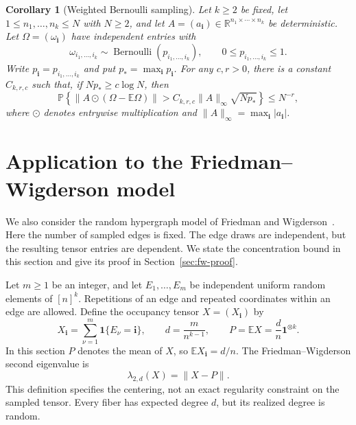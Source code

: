 \documentclass[11pt,reqno]{amsart}
\numberwithin{equation}{section}
\newtheorem{corollary}[theorem]{Corollary}
\theoremstyle{definition}
\theoremstyle{remark}
\newcommand{\E}{\mathbb E}
\newcommand{\Pp}{\mathbb P}
\newcommand{\R}{\mathbb R}
\newcommand{\one}{\mathbf 1}
\begin{document}
\begin{corollary}[Weighted Bernoulli sampling]\label{cor:weighted}
Let $k\ge2$ be fixed, let $1\le n_1,\ldots,n_k\le N$ with $N\ge2$,
and let $A=(a_{\mathbf i})\in\R^{n_1\times\cdots\times n_k}$ be
deterministic. Let $\Omega=(\omega_{\mathbf i})$ have independent
entries with
\[
 \omega_{i_1,\ldots,i_k}\sim
 \operatorname{Bernoulli}(p_{i_1,\ldots,i_k}),
 \qquad 0\le p_{i_1,\ldots,i_k}\le1.
\]
Write $p_{\mathbf i}=p_{i_1,\ldots,i_k}$ and put
$p_*=\max_{\mathbf i}p_{\mathbf i}$.
For any $c,r>0$, there is a constant $C_{k,r,c}$ such that, if
$Np_*\ge c\log N$, then
\begin{equation}\label{eq:weighted}
 \Pp\left\{\|A\odot(\Omega-\E\Omega)\|>
 C_{k,r,c}\|A\|_\infty\sqrt{Np_*}\right\}\le N^{-r},
\end{equation}
where $\odot$ denotes entrywise multiplication and
$\|A\|_\infty=\max_{\mathbf i}|a_{\mathbf i}|$.
\end{corollary}

\section{Application to the Friedman--Wigderson model}\label{sec:fw}

We also consider the random hypergraph model of Friedman and
Wigderson~\cite[Section~6]{FW95}. Here the number of sampled
edges is fixed. The edge draws are independent, but the resulting
tensor entries are dependent. We state the concentration bound
in this section and give its proof in Section~\ref{sec:fw-proof}.

Let $m\ge1$ be an integer, and let $E_1,\ldots,E_m$ be independent
uniform random elements of $[n]^k$. Repetitions of an edge and
repeated coordinates within an edge are allowed. Define the
occupancy tensor $X=(X_{\mathbf i})$ by
\begin{equation}\label{eq:fw-model}
 X_{\mathbf i}=\sum_{\nu=1}^m\one\{E_\nu=\mathbf i\},
 \qquad d=\frac{m}{n^{k-1}},\qquad
 P=\E X=\frac dn\one^{\otimes k}.
\end{equation}
In this section $P$ denotes the mean of $X$, so $\E X_{\mathbf i}=d/n$.
The Friedman--Wigderson second eigenvalue is
\begin{equation}\label{eq:fw-lambda}
 \lambda_{2,d}(X)
 =\|X-P\|.
\end{equation}
This definition specifies the centering, not an exact regularity
constraint on the sampled tensor. Every fiber has expected degree $d$,
but its realized degree is random.
\end{document}
